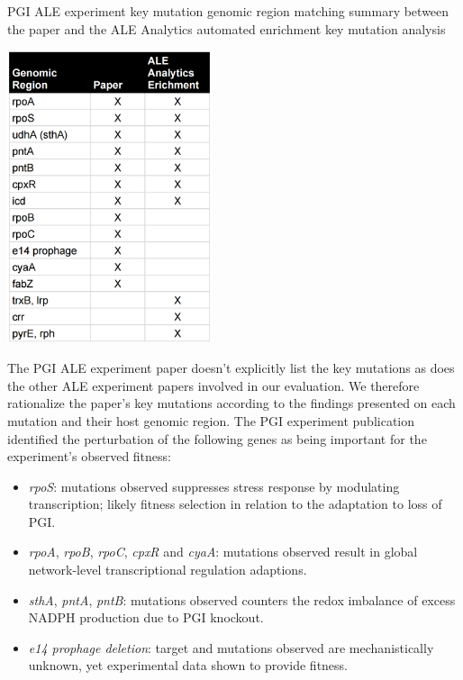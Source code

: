 \documentclass[12pt,final,masters,chapterheads]{ucsd}  %
\begin{document}
\begin{table}[H]
  \caption{PGI ALE experiment key mutation genomic region matching summary between the paper and the ALE Analytics automated enrichment key mutation analysis}
  \centering
  \includegraphics[width=0.45\textwidth]{pgi_key_mutation_regions.png}
\end{table}
The PGI ALE experiment paper doesn't explicitly list the key mutations as does the other ALE experiment papers involved in our evaluation. We therefore rationalize the paper's key mutations according to the findings presented on each mutation and their host genomic region. The PGI experiment publication identified the perturbation of the following genes as being important for the experiment's observed fitness:
\begin{itemize}
\item \textit{rpoS}: mutations observed suppresses stress response by modulating transcription; likely fitness selection in relation to the adaptation to loss of PGI.
\item \textit{rpoA}, \textit{rpoB}, \textit{rpoC}, \textit{cpxR} and \textit{cyaA}: mutations observed result in global network-level transcriptional regulation adaptions.
\item \textit{sthA}, \textit{pntA}, \textit{pntB}: mutations observed counters the redox imbalance of excess NADPH production due to PGI knockout.
\item \textit{e14 prophage deletion}: target and mutations observed are mechanistically unknown, yet experimental data shown to provide fitness.
\end{itemize}
\end{document}
